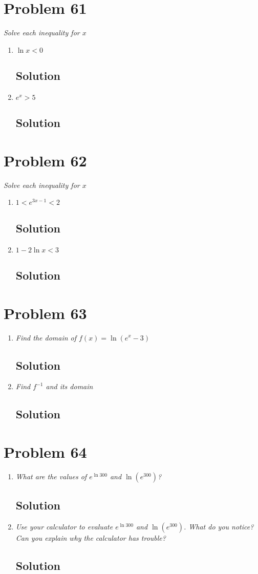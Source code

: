\documentclass[11pt]{article}
\newcommand{\soln}{\subsection*}
\newcommand{\qn}{\textit}
\begin{document}
\section*{Problem 61}

\qn{Solve each inequality for $x$}
\begin{enumerate}
	\item \qn{$\ln{x}<0$}
	\soln{Solution}
	
	\item \qn{$e^x>5$}
	\soln{Solution}
\end{enumerate}


\section*{Problem 62}

\qn{Solve each inequality for $x$}
\begin{enumerate}
	\item \qn{$1 < e^{3x-1} < 2$}
	\soln{Solution}
	
	\item \qn{$1 -2\ln{x}<3$}
	\soln{Solution}
\end{enumerate}

\section*{Problem 63}

\begin{enumerate}
	\item \qn{Find the domain of $f(x)=\ln(e^x-3)$}
	\soln{Solution}
	
	\item \qn{Find $f^{-1}$ and its domain}
	\soln{Solution}
\end{enumerate}

\section*{Problem 64}

\begin{enumerate}
	\item \qn{What are the values of $e^{\ln{300}}$ and $\ln(e^300)$?}
	\soln{Solution}
	
	\item \qn{Use your calculator to evaluate $e^{\ln{300}}$ and $\ln(e^{300})$. What do you notice? Can you explain why the calculator has trouble?}
	\soln{Solution}
\end{enumerate}
\end{document}
